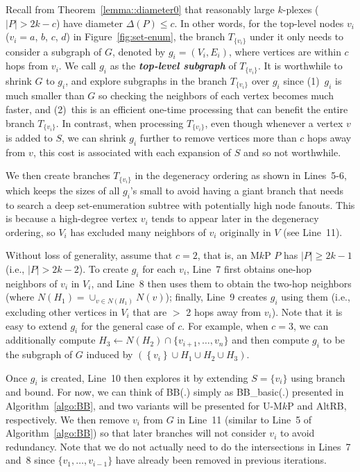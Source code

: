 \documentclass[sigconf,anonymous,review]{acmart}
\begin{document}
Recall from Theorem~\ref{lemma::diameter0} that reasonably large $k$-plexes ($|P|> 2k-c$) have diameter $\Delta(P)\leq c$. In other words, for the top-level nodes ${v_i}$ ($v_i=a$, $b$, $c$, $d$) in Figure~\ref{fig:set-enum}, the branch $T_{\{v_i\}}$ under it only needs to consider a subgraph of $G$, denoted by $g_i=(V_i, E_i)$, where vertices are within $c$ hops from $v_i$. We call $g_i$ as the {\bf\em top-level subgraph} of $T_{\{v_i\}}$. 
%
It is worthwhile to shrink $G$ to $g_i$, and explore subgraphs in the branch $T_{\{v_i\}}$ over $g_i$ since (1)~$g_i$ is much smaller than $G$ so checking the neighbors of each vertex becomes much faster, and (2)~this is an efficient one-time processing that can benefit the entire branch $T_{\{v_i\}}$. In contrast, when processing $T_{\{v_i\}}$, even though whenever a vertex $v$ is added to $S$, we can shrink $g_i$ further to remove vertices more than $c$ hops away from $v$, this cost is associated with each expansion of $S$ and so not worthwhile. 

We then create branches $T_{\{v_i\}}$ in the degeneracy ordering as shown in Lines~5-6, which keeps the sizes of all $g_i$'s small to avoid having a giant branch that needs to search a deep set-enumeration subtree with potentially high node fanouts. This is because a high-degree vertex $v_i$ tends to appear later in the degeneracy ordering, so $V_i$ has excluded many neighbors of $v_i$ originally in $V$ (see Line~11). 

Without loss of generality, assume that $c=2$, that is, an M$k$P $P$ has $|P|\ge2k-1$ (i.e., $|P|>2k-2$). 
%
To create $g_i$ for each $v_i$, Line~7 first obtains one-hop neighbors of $v_i$ in $V_i$, and Line~8 then uses them to obtain the two-hop neighbors (where $N(H_1)=\cup_{v\in N(H_1)}N(v)$); finally, Line~9 creates $g_i$ using them (i.e., excluding other vertices in $V_i$ that are $>$ 2 hops away from $v_i$). 
%
{ Note that it is easy to extend $g_i$ for the general case of $c$. For example, when $c=3$, we can additionally compute $H_3 \gets N(H_2) \cap \{v_{i+1}, \dots, v_n\}$ and then compute $g_i$ to be the subgraph of $G$ induced by $\left(\left\{v_i\right\} \cup H_1\cup H_2\cup H_3\right)$.}

Once $g_i$ is created, Line~10 then explores it by extending $S=\{v_i\}$ using branch and bound. For now, we can think of BB(.) simply as BB\_basic(.) presented in Algorithm~\ref{algo:BB}, and two variants will be presented for U-M$k$P and AltRB, respectively. 
%
We then remove $v_i$ from $G$ in Line~11 (similar to Line~5 of Algorithm~\ref{algo:BB}) so that later branches will not consider $v_i$ to avoid redundancy. Note that we do not actually need to do the intersections in Lines~7 and~8 since $\{v_1, \ldots, v_{i-1}\}$ have already been removed in previous iterations.
\end{document}

